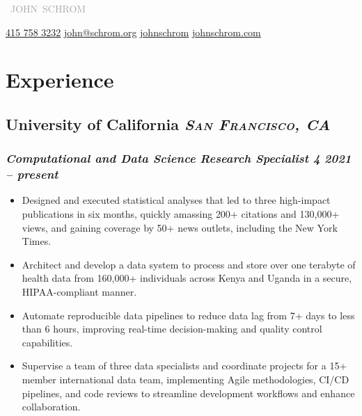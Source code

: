 \documentclass[11pt]{article}
\newcommand{\rside}[1]{
  \hfill {\itshape #1}%
}
\begin{document}

\begin{center}
  {
    \mbox{
    \fontsize{30}{12} 
    \selectfont
    \textcolor{darkgray}{JOHN SCHROM}
    }
  } \\ \medskip


  \href{tel:4157583232}{{\color{gray}{\faMobile}} 415 758 3232} \quad
  \href{mailto:john@schrom.org}{{\color{gray}{\faEnvelope}} john@schrom.org} \quad 
  \href{https://github.com/johnschrom}{{\color{gray}{\faGithub}} johnschrom} \quad
  \href{https://johnschrom.com/}{{\color{gray}{\faLink}} johnschrom.com} 
\end{center}


\section{Experience}
\subsection{University of California \rside{\normalfont\large\bfseries\scshape{San Francisco, CA}}}
\subsubsection{\textit{Computational and Data Science Research Specialist 4} \rside{2021 -- present}}
\begin{itemize}[label=-]
  \item Designed and executed statistical analyses that led to three high-impact publications in six months, quickly amassing \textcolor{Bittersweet}{200+ citations} and \textcolor{Bittersweet}{130,000+ views}, and gaining coverage by \textcolor{Bittersweet}{50+ news outlets}, including the New York Times.
  \item Architect and develop a data system to process and store over \textcolor{Bittersweet}{one terabyte of health data} from \textcolor{Bittersweet}{160,000+ individuals} across Kenya and Uganda in a secure, HIPAA-compliant manner.
  \item Automate reproducible data pipelines to reduce data lag \textcolor{Bittersweet}{from 7+ days} to \textcolor{Bittersweet}{less than 6 hours}, improving real-time decision-making and quality control capabilities.
  \item Supervise a \textcolor{Bittersweet}{team of three data specialists} and coordinate projects for a \textcolor{Bittersweet}{15+ member international data team}, implementing Agile methodologies, CI/CD pipelines, and code reviews to streamline development workflows and enhance collaboration.
\end{itemize}
\end{document}
